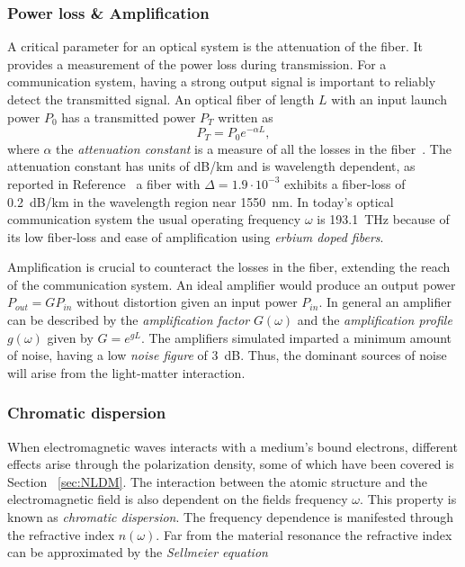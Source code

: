 \subsubsection{Power loss \& Amplification}
A critical parameter for an optical system is the attenuation of the fiber. It provides a measurement of the power loss during transmission. For a communication system, having a strong output signal is important to reliably detect the transmitted signal. An optical fiber of length $L$ with an input launch power $P_0$ has a transmitted power $P_T$ written as 
\begin{equation}
P_T=P_0e^{-\alpha L},
\end{equation}
where $\alpha$ the \emph{attenuation constant} is a measure of all the losses in the fiber~\cite{agrawal2000nonlinear}. The attenuation constant has units of dB/km and is wavelength dependent, as reported in Reference~\cite{miya1979ultimate} a fiber with $\Delta=1.9\cdot10^{-3}$ exhibits a fiber-loss of 0.2~dB/km in the wavelength region near 1550~nm. In today's optical communication system the usual operating frequency $\omega$ is 193.1~THz because of its low fiber-loss and ease of amplification using \textit{erbium doped fibers}.

Amplification is crucial to counteract the losses in the fiber, extending the reach of the communication system. An ideal amplifier would produce an output power $P_{out} = G P_{in}$ without distortion given an input power $P_{in}$. In general an amplifier can be described by the  \textit{amplification factor} $G(\omega)$ and the \textit{amplification profile} $g(\omega)$ given by $G=e^{gL}$. The amplifiers simulated imparted a minimum amount of noise, having a low \textit{noise figure} of 3~dB. Thus, the dominant sources of noise will arise from the light-matter interaction.



\subsubsection{Chromatic dispersion}\label{sec:CD}

When electromagnetic waves interacts with a medium's bound electrons, different effects arise through the polarization density, some of which have been covered is Section~ \ref{sec:NLDM}. The interaction between the atomic structure and the electromagnetic field is also dependent on the fields frequency $\omega$. This property is known as \textit{chromatic dispersion}. The frequency dependence is manifested through the refractive index $n(\omega)$. Far from the material resonance the refractive index can be approximated by the \emph{Sellmeier equation}~\cite{agrawal2000nonlinear,FiberAgrawal}

